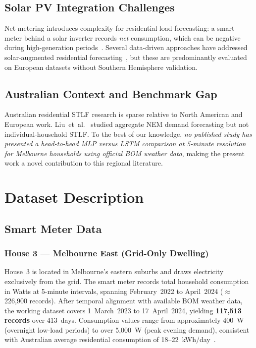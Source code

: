\documentclass[12pt,a4paper]{article}
\begin{document}
\subsection{Solar PV Integration Challenges}

Net metering introduces complexity for residential load forecasting: a smart
meter behind a solar inverter records \emph{net} consumption, which can be
negative during high-generation periods~\cite{nottrott2013}. Several
data-driven approaches have addressed solar-augmented residential
forecasting~\cite{bacher2009,ahmad2020}, but these are predominantly evaluated
on European datasets without Southern Hemisphere validation.

\subsection{Australian Context and Benchmark Gap}

Australian residential STLF research is sparse relative to North American and
European work. Liu~et~al.~\cite{liu2014} studied aggregate NEM demand
forecasting but not individual-household STLF. To the best of our knowledge,
\emph{no published study has presented a head-to-head MLP versus LSTM
comparison at 5-minute resolution for Melbourne households using official BOM
weather data}, making the present work a novel contribution to this regional
literature.

\section{Dataset Description}
\label{sec:data}

\subsection{Smart Meter Data}

\subsubsection{House 3 --- Melbourne East (Grid-Only Dwelling)}

House~3 is located in Melbourne's eastern suburbs and draws electricity
exclusively from the grid. The smart meter records total household consumption
in Watts at 5-minute intervals, spanning February~2022 to April~2024
(${\approx}$226,900 records). After temporal alignment with available BOM
weather data, the working dataset covers 1~March~2023 to 17~April~2024,
yielding \textbf{117,513 records} over 413~days. Consumption values range
from approximately 400~W (overnight low-load periods) to over 5{,}000~W (peak
evening demand), consistent with Australian average residential consumption of
18--22~kWh/day~\cite{aemo2020}.
\end{document}
